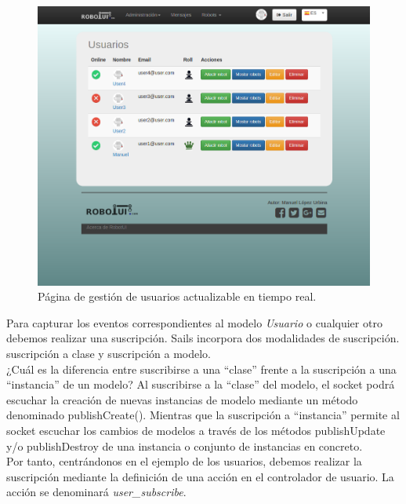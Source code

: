 \begin{figure}[H]
  \begin{center}
    \includegraphics[scale=0.35]{imagenes/comunicaciones/index-usuarios.png}
  \end{center}
  \caption{Página de gestión de usuarios actualizable en tiempo real.}
  \label{view:userindex}
\end{figure}

Para capturar los eventos correspondientes al modelo \emph{Usuario} o cualquier otro debemos realizar una suscripción. Sails incorpora dos modalidades de suscripción. suscripción a clase y 
suscripción a modelo.\\

¿Cuál es la diferencia entre suscribirse a una ``clase'' frente a la suscripción a una ``instancia'' de un modelo? Al suscribirse a la ``clase'' del modelo, el socket podrá escuchar la creación de 
nuevas instancias de modelo mediante un método denominado publishCreate(). Mientras que la suscripción a ``instancia'' permite al socket escuchar los cambios de modelos a través de los métodos
publishUpdate y/o publishDestroy de una instancia o conjunto de instancias en concreto.\\


Por tanto, centrándonos en el ejemplo de los usuarios, debemos realizar la suscripción mediante la definición de una acción en el controlador de usuario. La acción se denominará \emph{user\_subscribe}.\\


